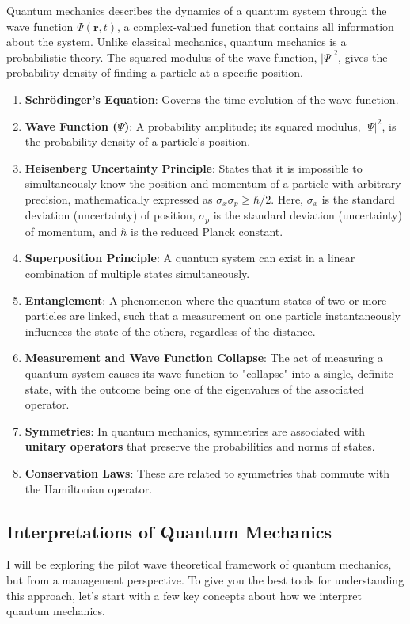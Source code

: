\documentclass{article}
\begin{document}
 Quantum mechanics describes the dynamics of a quantum system through the wave function $\Psi(\mathbf{r}, t)$, a complex-valued function that contains all information about the system. Unlike classical mechanics, quantum mechanics is a probabilistic theory. The squared modulus of the wave function, $|\Psi|^2$, gives the probability density of finding a particle at a specific position.
 
 \begin{enumerate}
 	\item \textbf{Schrödinger's Equation}: Governs the time evolution of the wave function.
 	\item \textbf{Wave Function ($\Psi$)}: A probability amplitude; its squared modulus, $|\Psi|^2$, is the probability density of a particle's position.
 	\item \textbf{Heisenberg Uncertainty Principle}: States that it is impossible to simultaneously know the position and momentum of a particle with arbitrary precision, mathematically expressed as $\sigma_x \sigma_p \geq \hbar/2$. Here, $\sigma_x$ is the standard deviation (uncertainty) of position, $\sigma_p$ is the standard deviation (uncertainty) of momentum, and $\hbar$ is the reduced Planck constant.
 	\item \textbf{Superposition Principle}: A quantum system can exist in a linear combination of multiple states simultaneously.
 	\item \textbf{Entanglement}: A phenomenon where the quantum states of two or more particles are linked, such that a measurement on one particle instantaneously influences the state of the others, regardless of the distance.
 	\item \textbf{Measurement and Wave Function Collapse}: The act of measuring a quantum system causes its wave function to "collapse" into a single, definite state, with the outcome being one of the eigenvalues of the associated operator.
 	\item \textbf{Symmetries}: In quantum mechanics, symmetries are associated with \textbf{unitary operators} that preserve the probabilities and norms of states.
 	\item \textbf{Conservation Laws}: These are related to symmetries that commute with the Hamiltonian operator.
 \end{enumerate}
 \subsection{Interpretations of Quantum Mechanics}
I will be exploring the pilot wave theoretical framework of quantum mechanics, but from a management perspective. To give you the best tools for understanding this approach, let's start with a few key concepts about how we interpret quantum mechanics.
\end{document}
